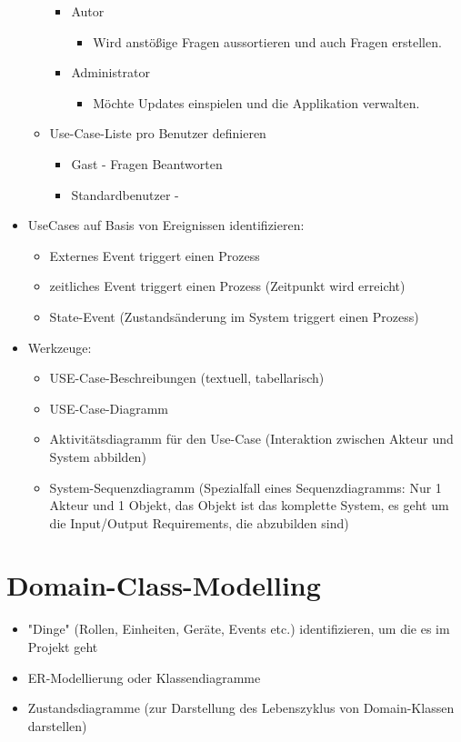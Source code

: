 \begin{itemize}
\begin{itemize}
\begin{itemize}
\begin{itemize}
					\end{itemize}
				\item Autor
					\begin{itemize}
						\item Wird anstößige Fragen aussortieren und auch Fragen erstellen.
					\end{itemize}
				\item Administrator
					\begin{itemize}
						\item Möchte Updates einspielen und die Applikation verwalten. 
					\end{itemize}
			\end{itemize} 
		\item Use-Case-Liste pro Benutzer definieren
			\begin{itemize}
				\item Gast - Fragen Beantworten
				\item Standardbenutzer - 
			\end{itemize}
		\end{itemize}
	\item UseCases auf Basis von Ereignissen identifizieren: 
	\begin{itemize}
		\item Externes Event triggert einen Prozess
		\item zeitliches Event triggert einen Prozess (Zeitpunkt wird erreicht) 
		\item State-Event (Zustandsänderung im System triggert einen Prozess)
	\end{itemize}
	\item Werkzeuge:
	\begin{itemize}
		\item USE-Case-Beschreibungen (textuell, tabellarisch)
		\item USE-Case-Diagramm
		\item Aktivitätsdiagramm für den Use-Case (Interaktion zwischen Akteur und System abbilden)
		\item System-Sequenzdiagramm (Spezialfall eines Sequenzdiagramms: Nur 1 Akteur und 1 Objekt, das Objekt ist das komplette System, es geht um die Input/Output Requirements, die abzubilden sind)
	\end{itemize}
\end{itemize}

\section{Domain-Class-Modelling}
\begin{itemize}
	\item "Dinge" (Rollen, Einheiten, Geräte, Events etc.) identifizieren, um die es im Projekt geht
	\item ER-Modellierung oder Klassendiagramme
	\item Zustandsdiagramme (zur Darstellung des Lebenszyklus von Domain-Klassen darstellen)
\end{itemize}

